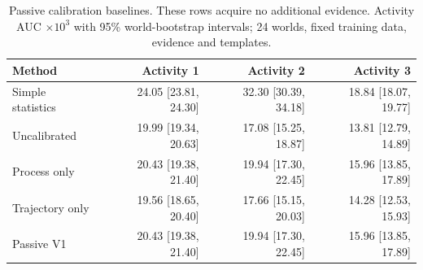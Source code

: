 \begin{table}[H]
\centering
\caption{Passive calibration baselines. These rows acquire no additional evidence. Activity AUC $\times10^3$ with 95\% world-bootstrap intervals; 24 worlds, fixed training data, evidence and templates.}
\label{tab:calibration}
\scriptsize
\setlength{\tabcolsep}{3pt}
\begin{tabular}{lrrr}
\toprule
Method & Activity 1 & Activity 2 & Activity 3 \\
\midrule
Simple statistics & 24.05 [23.81, 24.30] & 32.30 [30.39, 34.18] & 18.84 [18.07, 19.77] \\
Uncalibrated & 19.99 [19.34, 20.63] & 17.08 [15.25, 18.87] & 13.81 [12.79, 14.89] \\
Process only & 20.43 [19.38, 21.40] & 19.94 [17.30, 22.45] & 15.96 [13.85, 17.89] \\
Trajectory only & 19.56 [18.65, 20.40] & 17.66 [15.15, 20.03] & 14.28 [12.53, 15.93] \\
Passive V1 & 20.43 [19.38, 21.40] & 19.94 [17.30, 22.45] & 15.96 [13.85, 17.89] \\
\bottomrule
\end{tabular}
\end{table}
